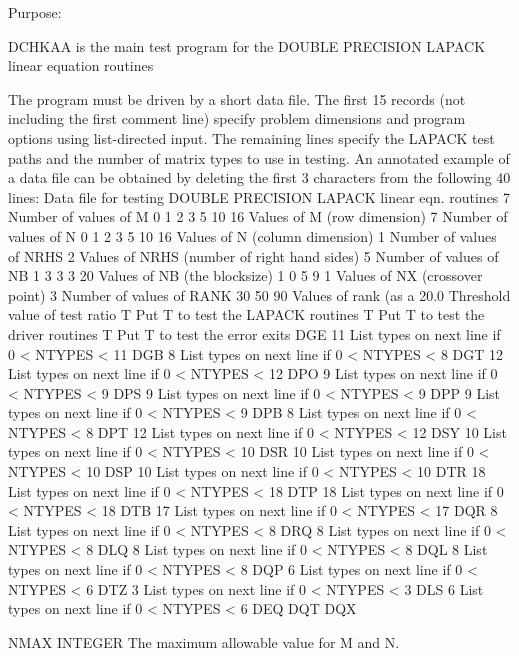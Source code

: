 \begin{DoxyParagraph}{Purpose\+: }
\begin{DoxyVerb} DCHKAA is the main test program for the DOUBLE PRECISION LAPACK
 linear equation routines

 The program must be driven by a short data file. The first 15 records
 (not including the first comment  line) specify problem dimensions
 and program options using list-directed input. The remaining lines
 specify the LAPACK test paths and the number of matrix types to use
 in testing.  An annotated example of a data file can be obtained by
 deleting the first 3 characters from the following 40 lines:
 Data file for testing DOUBLE PRECISION LAPACK linear eqn. routines
 7                      Number of values of M
 0 1 2 3 5 10 16        Values of M (row dimension)
 7                      Number of values of N
 0 1 2 3 5 10 16        Values of N (column dimension)
 1                      Number of values of NRHS
 2                      Values of NRHS (number of right hand sides)
 5                      Number of values of NB
 1 3 3 3 20             Values of NB (the blocksize)
 1 0 5 9 1              Values of NX (crossover point)
 3                      Number of values of RANK
 30 50 90               Values of rank (as a %
 20.0                   Threshold value of test ratio
 T                      Put T to test the LAPACK routines
 T                      Put T to test the driver routines
 T                      Put T to test the error exits
 DGE   11               List types on next line if 0 < NTYPES < 11
 DGB    8               List types on next line if 0 < NTYPES <  8
 DGT   12               List types on next line if 0 < NTYPES < 12
 DPO    9               List types on next line if 0 < NTYPES <  9
 DPS    9               List types on next line if 0 < NTYPES <  9
 DPP    9               List types on next line if 0 < NTYPES <  9
 DPB    8               List types on next line if 0 < NTYPES <  8
 DPT   12               List types on next line if 0 < NTYPES < 12
 DSY   10               List types on next line if 0 < NTYPES < 10
 DSR   10               List types on next line if 0 < NTYPES < 10
 DSP   10               List types on next line if 0 < NTYPES < 10
 DTR   18               List types on next line if 0 < NTYPES < 18
 DTP   18               List types on next line if 0 < NTYPES < 18
 DTB   17               List types on next line if 0 < NTYPES < 17
 DQR    8               List types on next line if 0 < NTYPES <  8
 DRQ    8               List types on next line if 0 < NTYPES <  8
 DLQ    8               List types on next line if 0 < NTYPES <  8
 DQL    8               List types on next line if 0 < NTYPES <  8
 DQP    6               List types on next line if 0 < NTYPES <  6
 DTZ    3               List types on next line if 0 < NTYPES <  3
 DLS    6               List types on next line if 0 < NTYPES <  6
 DEQ
 DQT
 DQX\end{DoxyVerb}
 \begin{DoxyVerb}  NMAX    INTEGER
          The maximum allowable value for M and N.


\end{DoxyVerb}
\end{DoxyParagraph}
